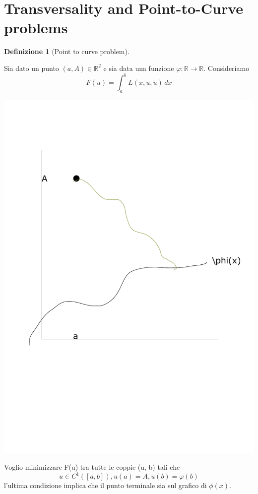 \documentclass[a4paper]{book}
\theoremstyle{definition}
\newtheorem{defn}{Definizione}
\theoremstyle{remark}
\theoremstyle{definition}
\newcommand{\bbr}{\mathbb{R}}
\begin{document}
\section{Transversality and Point-to-Curve problems}

\begin{defn}[Point to curve problem]
\begin{table}[h]
\begin{minipage}[]{0.49\linewidth}
\begin{flushleft}
Sia dato un punto $(a, A)\in \bbr^2$ e sia data una funzione $\varphi :\bbr\to\bbr$. Consideriamo
\[
	F(u) = \int_{a}^{b}L(x, u, \dot{u})\,dx
\]	
\end{flushleft}
\end{minipage}
\hspace{10mm}
\begin{minipage}[]{0.49\linewidth}
\begin{flushright}
\includegraphics[scale=0.2]{capitolo7.pdf}
\end{flushright}
\end{minipage}
\end{table}

Voglio minimizzare F(u) tra tutte le coppie (u, b) tali che
\[
	u \in C^1([a,b]), u(a)=A, u(b) = \varphi(b)
\]
l'ultima condizione implica che il punto terminale sia sul grafico di $\phi(x)$.
\end{defn}
\end{document}
